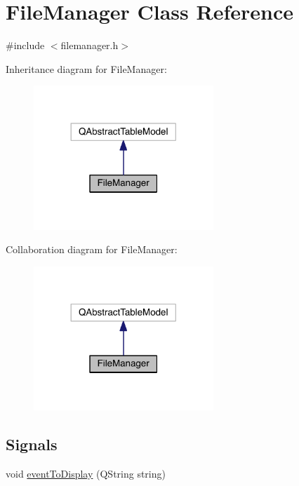 \hypertarget{class_file_manager}{}\section{File\+Manager Class Reference}
\label{class_file_manager}


{\ttfamily \#include $<$filemanager.\+h$>$}



Inheritance diagram for File\+Manager\+:
\nopagebreak
\begin{figure}[H]
\begin{center}
\leavevmode
\includegraphics[width=192pt]{class_file_manager__inherit__graph}
\end{center}
\end{figure}


Collaboration diagram for File\+Manager\+:
\nopagebreak
\begin{figure}[H]
\begin{center}
\leavevmode
\includegraphics[width=192pt]{class_file_manager__coll__graph}
\end{center}
\end{figure}
\subsection*{Signals}
\begin{DoxyCompactItemize}
\item 
void \hyperlink{class_file_manager_a122e43a43028aaa6e1fafe3a2966cc72}{event\+To\+Display} (Q\+String string)
\end{DoxyCompactItemize}
